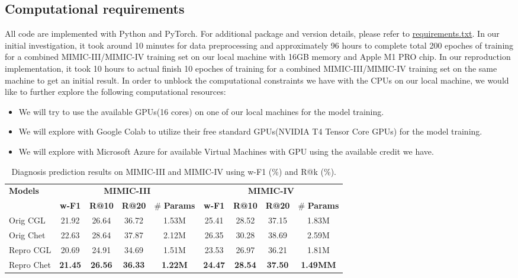 \documentclass[11pt,a4paper,fleqn]{article}
\begin{document}
\subsection{Computational requirements}
All code are implemented with Python and PyTorch. For additional package and
version details, please refer to
\href{https://github.com/willtsai/dlh-sp23-team53/blob/main/requirements.txt}{requirements.txt}.
In our initial investigation, it took around 10 minutes for data preprocessing
and approximately 96 hours to complete total 200 epoches of training for a
combined MIMIC-III/MIMIC-IV training set on our local machine with 16GB memory
and Apple M1 PRO chip. In our reproduction implementation, it took 10 hours to
actual finish 10 epoches of training for a combined MIMIC-III/MIMIC-IV training
set on the same machine to get an initial result. In order to unblock the
computational constraints we have with the CPUs on our local machine, we would
like to further explore the following computational resources:
\begin{itemize}
  \item We will try to use the available GPUs(16 cores) on one of our local
  machines for the model training.
  \item We will explore with Google Colab to utilize their free standard
  GPUs(NVIDIA T4 Tensor Core GPUs) for the model training.
  \item We will explore with Microsoft Azure for available Virtual Machines with
  GPU using the available credit we have.
\end{itemize}

\begin{table*}[ht]
  \centering
  \begin{tabular}{lcccc|cccc} \hline \hline
    \cline{2-9} {\bf Models} & \multicolumn{4}{c}{\bf MIMIC-III} & \multicolumn{4}{c}{\bf MIMIC-IV} \\
    \cline{2-9} & \bf w-F1 & \bf R@10 & \bf R@20 & \# \bf Params & \bf w-F1 & \bf R@10 & \bf R@20 & \#
    \bf Params \\ \hline
    {Orig CGL} & 21.92 & 26.64 & 36.72 & 1.53M & 25.41 & 28.52 &
    37.15 & 1.83M \\
    {Orig Chet} & 22.63 & 28.64 & 37.87 & 2.12M 
    & 26.35 & 30.28 & 38.69 & 2.59M \\
    \hline
    {Repro CGL} & 20.69 & 24.91 & 34.69 & 1.51M & 23.53 & 26.97 &
    36.21 & 1.81M \\
    {Repro Chet} & \bf 21.45 & \bf 26.56 & \bf 36.33 & \bf 1.22M
    & \bf 24.47 & \bf 28.54 & \bf 37.50 & \bf 1.49MM \\ 
    \hline \hline
  \end{tabular}
  \caption{Diagnosis prediction results on MIMIC-III and MIMIC-IV using w-F1 (\%) and R@k (\%).}
  \label{tab:diag}
  \end{table*}
\end{document}
